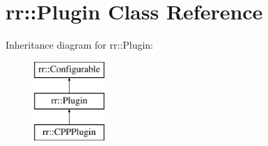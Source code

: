 \hypertarget{classrr_1_1_plugin}{\section{rr\-:\-:Plugin Class Reference}
\label{classrr_1_1_plugin}
}
Inheritance diagram for rr\-:\-:Plugin\-:\begin{figure}[H]
\begin{center}
\leavevmode
\includegraphics[height=3.000000cm]{classrr_1_1_plugin}
\end{center}
\end{figure}
